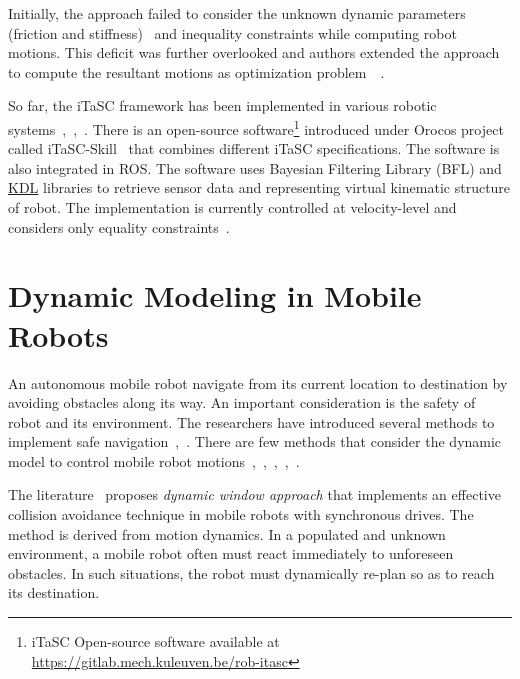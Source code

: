 Initially, the approach failed to consider the unknown dynamic parameters (friction and stiffness)~\cite{de2007constraint} and inequality constraints while computing robot motions. This deficit was further overlooked and authors extended the approach to compute the resultant motions as optimization problem~\cite{decre2013extending}~\cite{decre2009extending}. 

So far, the iTaSC framework has been implemented in various robotic systems~\cite{han2017interaction},~\cite{vanthienen2011itasc},~\cite{somani2016task}. There is an open-source software\footnote{iTaSC Open-source software available at \url{https://gitlab.mech.kuleuven.be/rob-itasc}} introduced under Orocos project called iTaSC-Skill~\cite{itasc-software} that combines different iTaSC specifications. The software is also integrated in ROS. The software uses Bayesian Filtering Library (BFL) and \hyperref[kdl]{KDL} libraries to retrieve sensor data and representing virtual kinematic structure of robot. The implementation is currently controlled at velocity-level and considers only equality constraints~\cite{itasc-software}.

\section{Dynamic Modeling in Mobile Robots}

An autonomous mobile robot navigate from its current location to destination by avoiding obstacles along its way. An important consideration is the safety of robot and its environment. The researchers have introduced several methods to implement safe navigation~\cite{borenstein1990real},~\cite{adouane2011mobile}. There are few methods that consider the dynamic model to control mobile robot motions~\cite{fox1997dynamic},~\cite{asensio2002kinematic},~\cite{campion1996structural},~\cite{ge2002dynamic},~\cite{borenstein1989real}. 

The literature~\cite{fox1997dynamic} proposes \textit{dynamic window approach} that implements an effective collision avoidance technique in mobile robots with synchronous drives. The method is derived from motion dynamics. In a populated and unknown environment, a mobile robot often must react immediately to unforeseen obstacles. In such situations, the robot must dynamically re-plan so as to reach its destination.
